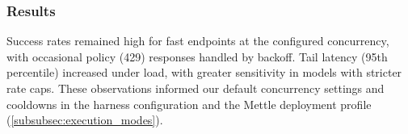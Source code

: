 \subsubsection{Results}\label{subsubsec:rate_limiting_results}

Success rates remained high for fast endpoints at the configured concurrency, with occasional policy (429) responses handled by backoff. Tail latency (95th percentile) increased under load, with greater sensitivity in models with stricter rate caps. These observations informed our default concurrency settings and cooldowns in the harness configuration and the Mettle deployment profile (\cref{subsubsec:execution_modes}).
